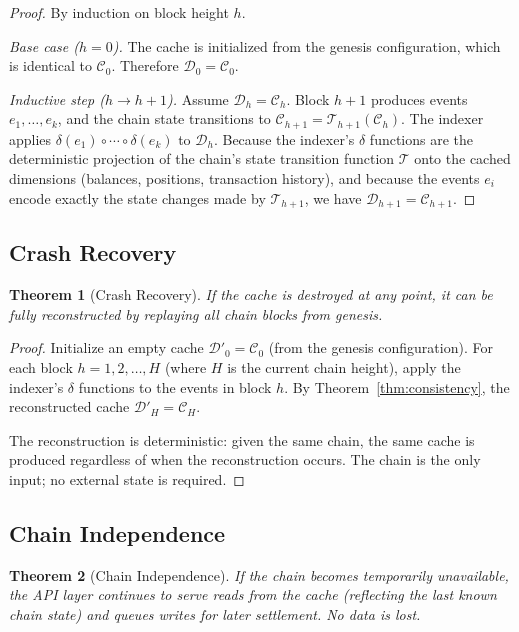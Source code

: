 \documentclass[11pt,a4paper]{article}
\newtheorem{theorem}{Theorem}[section]
\begin{document}
\begin{proof}
By induction on block height $h$.

\emph{Base case ($h = 0$).}  The cache is initialized from the genesis
configuration, which is identical to $\mathcal{C}_0$.  Therefore
$\mathcal{D}_0 = \mathcal{C}_0$.

\emph{Inductive step ($h \to h+1$).}  Assume
$\mathcal{D}_h = \mathcal{C}_h$.  Block $h+1$ produces events
$e_1, \ldots, e_k$, and the chain state transitions to
$\mathcal{C}_{h+1} = \mathcal{T}_{h+1}(\mathcal{C}_h)$.  The indexer
applies $\delta(e_1) \circ \cdots \circ \delta(e_k)$ to
$\mathcal{D}_h$.  Because the indexer's $\delta$ functions are the
deterministic projection of the chain's state transition function
$\mathcal{T}$ onto the cached dimensions (balances, positions,
transaction history), and because the events $e_i$ encode exactly the
state changes made by $\mathcal{T}_{h+1}$, we have
$\mathcal{D}_{h+1} = \mathcal{C}_{h+1}$.
\end{proof}

\subsection{Crash Recovery}

\begin{theorem}[Crash Recovery]
\label{thm:recovery}
If the cache is destroyed at any point, it can be fully reconstructed
by replaying all chain blocks from genesis.
\end{theorem}

\begin{proof}
Initialize an empty cache $\mathcal{D}'_0 = \mathcal{C}_0$ (from the
genesis configuration).  For each block $h = 1, 2, \ldots, H$ (where
$H$ is the current chain height), apply the indexer's $\delta$
functions to the events in block $h$.  By
Theorem~\ref{thm:consistency}, the reconstructed cache
$\mathcal{D}'_H = \mathcal{C}_H$.

The reconstruction is deterministic: given the same chain, the same
cache is produced regardless of when the reconstruction occurs.  The
chain is the only input; no external state is required.
\end{proof}

\subsection{Chain Independence}

\begin{theorem}[Chain Independence]
\label{thm:independence}
If the chain becomes temporarily unavailable, the API layer continues
to serve reads from the cache (reflecting the last known chain state)
and queues writes for later settlement.  No data is lost.
\end{theorem}
\end{document}
